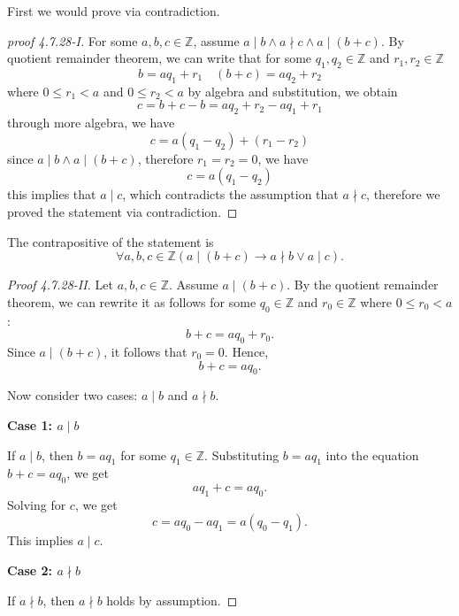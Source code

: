 \documentclass[12pt]{article}
\newcommand{\Z}{\mathbb{Z}}
\newcommand{\paren}[1]{\left( #1 \right)}
\begin{document}
\begin{enumerate}
        First we would prove via contradiction.
        \begin{proof}[proof 4.7.28-I]
            For some $a,b,c \in \Z$, assume $a \mid b \wedge a \nmid c \wedge a \mid (b+c)$. By quotient remainder theorem, we can write that for some $q_1,q_2 \in \Z$ and $r_1,r_2 \in \Z$
            \[
            b = aq_1 + r_1 \quad (b+c) = aq_2 + r_2
            \]
            where $0 \leq r_1 < a$ and $ 0 \leq r_2 < a$ by algebra and substitution, we obtain
            \[
            c = b+c - b = aq_2 + r_2 - aq_1 + r_1
            \]
            through more algebra, we have
            \[
            c = a \paren{q_1 - q_2} + \paren{r_1 - r_2 }
            \]
            since $a \mid b \wedge a \mid (b+c)$, therefore $r_1 = r_2 = 0$, we have
            \[
             c = a \paren{q_1 - q_2}
            \]
            this implies that $a \mid  c$, which contradicts the assumption that $a \nmid c$, therefore we proved the statement via contradiction. 
        \end{proof}
            The contrapositive of the statement is
            \[
            \forall a,b,c \in \mathbb{Z} \left( a \mid (b+c) \rightarrow a \nmid b \vee a \mid c \right).
            \]
            \begin{proof}[Proof 4.7.28-II]
            Let \( a, b, c \in \mathbb{Z} \). Assume \( a \mid (b+c) \). By the quotient remainder theorem, we can rewrite it as follows for some \( q_0 \in \mathbb{Z} \) and \( r_0 \in \mathbb{Z} \) where \( 0 \leq r_0 < a \):
            \[
            b + c = aq_0 + r_0.
            \]
            Since \( a \mid (b + c) \), it follows that \( r_0 = 0 \). Hence,
            \[
            b + c = aq_0.
            \]
            
            Now consider two cases: \( a \mid b \) and \( a \nmid b \).
            
            \textbf{Case 1: \( a \mid b \)}
            
            If \( a \mid b \), then \( b = aq_1 \) for some \( q_1 \in \mathbb{Z} \). Substituting \( b = aq_1 \) into the equation \( b + c = aq_0 \), we get
            \[
            aq_1 + c = aq_0.
            \]
            Solving for \( c \), we get
            \[
            c = aq_0 - aq_1 = a(q_0 - q_1).
            \]
            This implies \( a \mid c \).
            
            \textbf{Case 2: \( a \nmid b \)}
            
            If \( a \nmid b \), then \( a \nmid b \) holds by assumption.
            

\end{proof}
\end{enumerate}
\end{document}
